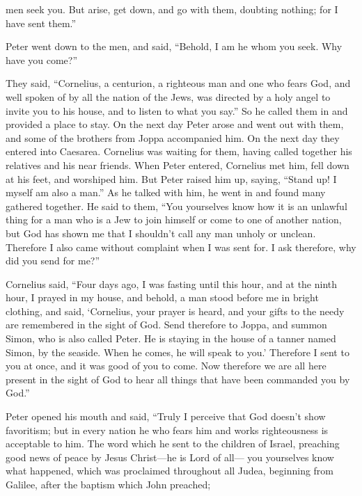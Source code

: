{ men seek you.
But arise, get down, and go with them, doubting nothing; for I have sent them.”
\par }{\PP {}Peter went down to the men, and said, “Behold, I am he whom you seek. Why have you come?”
\par }{\PP {}They said, “Cornelius, a centurion, a righteous man and one who fears God, and well spoken of by all the nation of the Jews, was directed by a holy angel to invite you to his house, and to listen to what you say.”
So he called them in and provided a place to stay. On the next day Peter arose and went out with them, and some of the brothers from Joppa accompanied him.
On the next day they entered into Caesarea. Cornelius was waiting for them, having called together his relatives and his near friends.
When Peter entered, Cornelius met him, fell down at his feet, and worshiped him.
But Peter raised him up, saying, “Stand up! I myself am also a man.”
As he talked with him, he went in and found many gathered together.
He said to them, “You yourselves know how it is an unlawful thing for a man who is a Jew to join himself or come to one of another nation, but God has shown me that I shouldn’t call any man unholy or unclean.
Therefore I also came without complaint when I was sent for. I ask therefore, why did you send for me?”
\par }{\PP {}Cornelius said, “Four days ago, I was fasting until this hour, and at the ninth hour, I prayed in my house, and behold, a man stood before me in bright clothing,
and said, ‘Cornelius, your prayer is heard, and your gifts to the needy are remembered in the sight of God.
Send therefore to Joppa, and summon Simon, who is also called Peter. He is staying in the house of a tanner named Simon, by the seaside. When he comes, he will speak to you.’
Therefore I sent to you at once, and it was good of you to come. Now therefore we are all here present in the sight of God to hear all things that have been commanded you by God.”
\par }{\PP {}Peter opened his mouth and said, “Truly I perceive that God doesn’t show favoritism;
but in every nation he who fears him and works righteousness is acceptable to him.
The word which he sent to the children of Israel, preaching good news of peace by Jesus Christ—he is Lord of all—
you yourselves know what happened, which was proclaimed throughout all Judea, beginning from Galilee, after the baptism which John preached;
}
